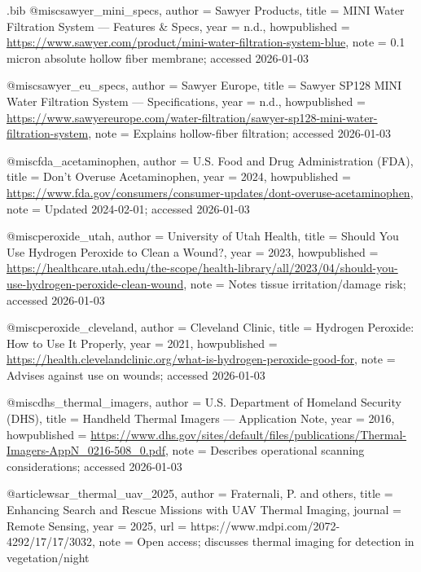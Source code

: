 \begin{filecontents*}{\jobname.bib}
@misc{sawyer_mini_specs,
  author       = {{Sawyer Products}},
  title        = {MINI Water Filtration System --- Features \& Specs},
  year         = {n.d.},
  howpublished = {\url{https://www.sawyer.com/product/mini-water-filtration-system-blue}},
  note         = {0.1 micron absolute hollow fiber membrane; accessed 2026-01-03}
}

@misc{sawyer_eu_specs,
  author       = {{Sawyer Europe}},
  title        = {Sawyer SP128 MINI Water Filtration System --- Specifications},
  year         = {n.d.},
  howpublished = {\url{https://www.sawyereurope.com/water-filtration/sawyer-sp128-mini-water-filtration-system}},
  note         = {Explains hollow-fiber filtration; accessed 2026-01-03}
}

@misc{fda_acetaminophen,
  author       = {{U.S. Food and Drug Administration (FDA)}},
  title        = {Don't Overuse Acetaminophen},
  year         = {2024},
  howpublished = {\url{https://www.fda.gov/consumers/consumer-updates/dont-overuse-acetaminophen}},
  note         = {Updated 2024-02-01; accessed 2026-01-03}
}

@misc{peroxide_utah,
  author       = {{University of Utah Health}},
  title        = {Should You Use Hydrogen Peroxide to Clean a Wound?},
  year         = {2023},
  howpublished = {\url{https://healthcare.utah.edu/the-scope/health-library/all/2023/04/should-you-use-hydrogen-peroxide-clean-wound}},
  note         = {Notes tissue irritation/damage risk; accessed 2026-01-03}
}

@misc{peroxide_cleveland,
  author       = {{Cleveland Clinic}},
  title        = {Hydrogen Peroxide: How to Use It Properly},
  year         = {2021},
  howpublished = {\url{https://health.clevelandclinic.org/what-is-hydrogen-peroxide-good-for}},
  note         = {Advises against use on wounds; accessed 2026-01-03}
}

@misc{dhs_thermal_imagers,
  author       = {{U.S. Department of Homeland Security (DHS)}},
  title        = {Handheld Thermal Imagers --- Application Note},
  year         = {2016},
  howpublished = {\url{https://www.dhs.gov/sites/default/files/publications/Thermal-Imagers-AppN_0216-508_0.pdf}},
  note         = {Describes operational scanning considerations; accessed 2026-01-03}
}

@article{wsar_thermal_uav_2025,
  author  = {Fraternali, P. and others},
  title   = {Enhancing Search and Rescue Missions with UAV Thermal Imaging},
  journal = {Remote Sensing},
  year    = {2025},
  url     = {https://www.mdpi.com/2072-4292/17/17/3032},
  note    = {Open access; discusses thermal imaging for detection in vegetation/night}
}


\end{filecontents*}
